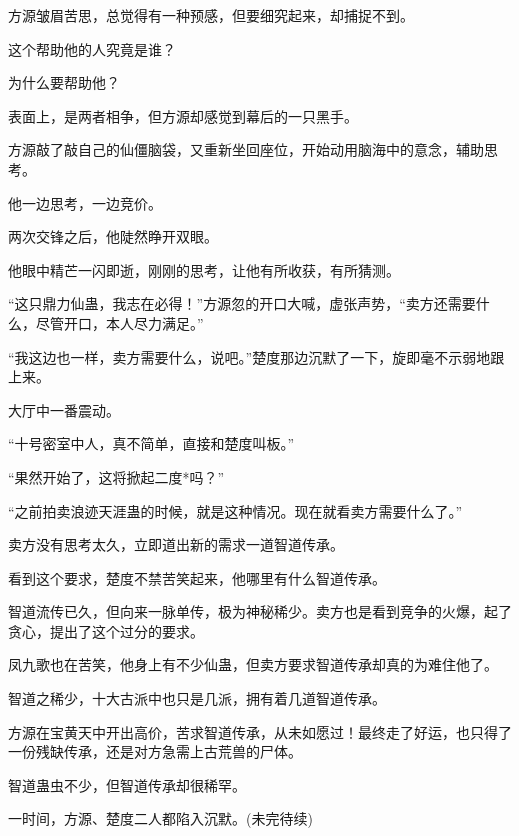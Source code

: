 \begin{this_body}
方源皱眉苦思，总觉得有一种预感，但要细究起来，却捕捉不到。

这个帮助他的人究竟是谁？

为什么要帮助他？

表面上，是两者相争，但方源却感觉到幕后的一只黑手。

方源敲了敲自己的仙僵脑袋，又重新坐回座位，开始动用脑海中的意念，辅助思考。

他一边思考，一边竞价。

两次交锋之后，他陡然睁开双眼。

他眼中精芒一闪即逝，刚刚的思考，让他有所收获，有所猜测。

“这只鼎力仙蛊，我志在必得！”方源忽的开口大喊，虚张声势，“卖方还需要什么，尽管开口，本人尽力满足。”

“我这边也一样，卖方需要什么，说吧。”楚度那边沉默了一下，旋即毫不示弱地跟上来。

大厅中一番震动。

“十号密室中人，真不简单，直接和楚度叫板。”

“果然开始了，这将掀起二度*吗？”

“之前拍卖浪迹天涯蛊的时候，就是这种情况。现在就看卖方需要什么了。”

卖方没有思考太久，立即道出新的需求一道智道传承。

看到这个要求，楚度不禁苦笑起来，他哪里有什么智道传承。

智道流传已久，但向来一脉单传，极为神秘稀少。卖方也是看到竞争的火爆，起了贪心，提出了这个过分的要求。

凤九歌也在苦笑，他身上有不少仙蛊，但卖方要求智道传承却真的为难住他了。

智道之稀少，十大古派中也只是几派，拥有着几道智道传承。

方源在宝黄天中开出高价，苦求智道传承，从未如愿过！最终走了好运，也只得了一份残缺传承，还是对方急需上古荒兽的尸体。

智道蛊虫不少，但智道传承却很稀罕。

一时间，方源、楚度二人都陷入沉默。(未完待续)

\end{this_body}

